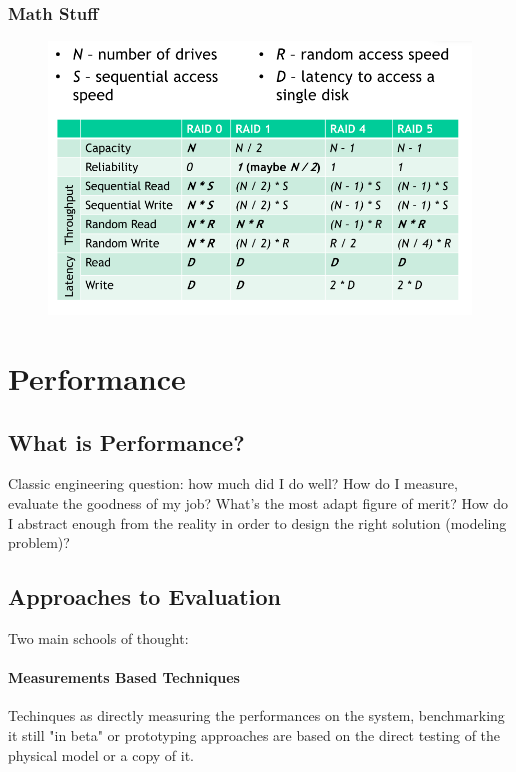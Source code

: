 \documentclass[10pt,a4paper]{article}
\begin{document}
				\subsubsection{Math Stuff}
					\begin{figure}[H]
						\centering
						\includegraphics[width = \textwidth]{./images/raids.png}
					\end{figure}
		
		\section{Performance}
			\subsection{What is Performance?}
				Classic engineering question: how much did I do well? How do I measure, evaluate the goodness of my job? What's the most adapt figure of merit? How do I abstract enough from the reality in order to design the right solution (modeling problem)?
				
			\subsection{Approaches to Evaluation}
				Two main schools of thought:
				
				\paragraph{Measurements Based Techniques}
					Techinques as directly measuring the performances on the system, benchmarking it still "in beta" or prototyping approaches are based on the direct testing of the physical model or a copy of it.
					
\end{document}
